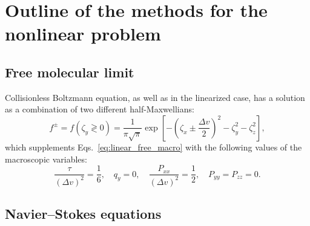 \documentclass[]{elsarticle} %
\begin{document}
\section{Outline of the methods for the nonlinear problem}

\subsection{Free molecular limit}

Collisionless Boltzmann equation, as well as in the linearized case,
has a solution as a combination of two different half-Maxwellians:
\begin{equation}\label{eq:free_solution}
    f^\pm = f(\zeta_y \gtrless 0) =
        \frac1{\pi\sqrt{\pi}} \exp\left[-\left(\zeta_x\pm\frac{\Delta{v}}2\right)^2 - \zeta_y^2 - \zeta_z^2\right],
\end{equation}
which supplements Eqs.~\eqref{eq:linear_free_macro} with the following values of the macroscopic variables:
\begin{equation}\label{eq:free_macro}
    \frac{\tau}{(\Delta{v})^2} = \frac16, \quad q_y = 0, \quad
    \frac{P_{xx}}{(\Delta{v})^2} = \frac12, \quad P_{yy} = P_{zz} = 0.
\end{equation}

\subsection{Navier--Stokes equations}\label{sec:Navier-Stokes}
\end{document}
